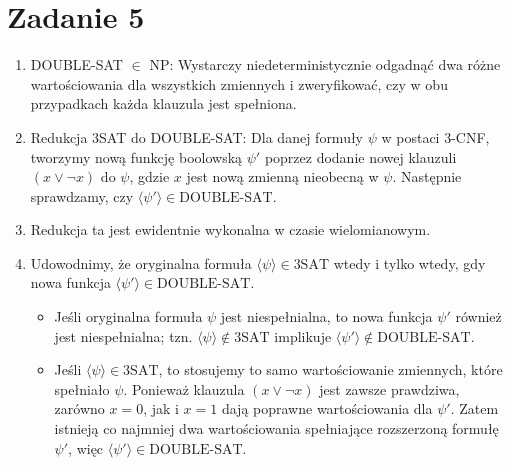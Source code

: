 \documentclass{article}
\begin{document}
\section{Zadanie 5}
\begin{enumerate}
    \item DOUBLE-SAT $\in$ NP: Wystarczy niedeterministycznie odgadnąć dwa różne wartościowania dla wszystkich zmiennych i zweryfikować, czy w obu przypadkach każda klauzula jest spełniona.

    \item Redukcja 3SAT do DOUBLE-SAT: Dla danej formuły $\psi$ w postaci 3-CNF, tworzymy nową funkcję boolowską $\psi'$ poprzez dodanie nowej klauzuli $(x \lor \neg x)$ do $\psi$, gdzie $x$ jest nową zmienną nieobecną w $\psi$. Następnie sprawdzamy, czy $\langle \psi' \rangle \in \text{DOUBLE-SAT}$.

    \item Redukcja ta jest ewidentnie wykonalna w czasie wielomianowym.

    \item Udowodnimy, że oryginalna formuła $\langle \psi \rangle \in \text{3SAT}$ wtedy i tylko wtedy, gdy nowa funkcja $\langle \psi' \rangle \in \text{DOUBLE-SAT}$.
    \begin{itemize}
        \item Jeśli oryginalna formuła $\psi$ jest niespełnialna, to nowa funkcja $\psi'$ również jest niespełnialna; tzn. $\langle \psi \rangle \notin \text{3SAT}$ implikuje $\langle \psi' \rangle \notin \text{DOUBLE-SAT}$.
        \item Jeśli $\langle \psi \rangle \in \text{3SAT}$, to stosujemy to samo wartościowanie zmiennych, które spełniało $\psi$. Ponieważ klauzula $(x \lor \neg x)$ jest zawsze prawdziwa, zarówno $x = 0$, jak i $x = 1$ dają poprawne wartościowania dla $\psi'$. Zatem istnieją co najmniej dwa wartościowania spełniające rozszerzoną formułę $\psi'$, więc $\langle \psi' \rangle \in \text{DOUBLE-SAT}$.
    \end{itemize}
\end{enumerate}
\end{document}
